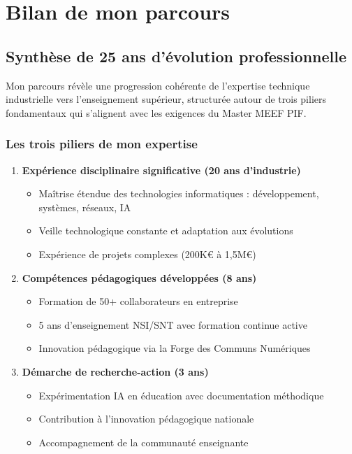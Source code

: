 \chapter{Bilan de mon parcours}

\section{Synthèse de 25 ans d'évolution professionnelle}

Mon parcours révèle une progression cohérente de l'expertise technique industrielle vers l'enseignement supérieur, structurée autour de trois piliers fondamentaux qui s'alignent avec les exigences du Master MEEF PIF.

\subsection{Les trois piliers de mon expertise}

\begin{enumerate}
\item \textbf{Expérience disciplinaire significative (20 ans d'industrie)}
   \begin{itemize}[leftmargin=*]
       \item Maîtrise étendue des technologies informatiques : développement, systèmes, réseaux, IA
       \item Veille technologique constante et adaptation aux évolutions
       \item Expérience de projets complexes (200K€ à 1,5M€)
   \end{itemize}

\item \textbf{Compétences pédagogiques développées (8 ans)}
   \begin{itemize}[leftmargin=*]
       \item Formation de 50+ collaborateurs en entreprise
       \item 5 ans d'enseignement NSI/SNT avec formation continue active
       \item Innovation pédagogique via la Forge des Communs Numériques
   \end{itemize}

\item \textbf{Démarche de recherche-action (3 ans)}
   \begin{itemize}[leftmargin=*]
       \item Expérimentation IA en éducation avec documentation méthodique
       \item Contribution à l'innovation pédagogique nationale
       \item Accompagnement de la communauté enseignante
   \end{itemize}
\end{enumerate}



